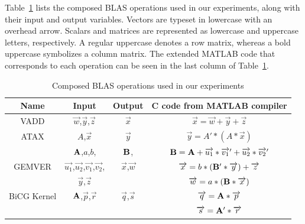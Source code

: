 \documentclass[runningheads]{llncs}
\begin{document}
Table~\ref{tbl:blas-ops} lists the composed BLAS operations used in
our experiments, along with their input and output variables. Vectors
are typeset in lowercase with an overhead arrow. Scalars and matrices
are represented as lowercase and uppercase letters, respectively. A
regular uppercase denotes a row matrix, whereas a bold uppercase
symbolizes a column matrix. The extended MATLAB code that corresponds
to each operation can be seen in the last column of
Table~\ref{tbl:blas-ops}.


\begin{table}[htb] 
\vspace{-.1in} 
\caption{Composed BLAS operations used in our experiments}
\label{tbl:blas-ops}
\small
\centering 
\vspace{-.1in} 
\begin{tabular}{|c|c|c|c|} 
\hline 
Name & Input & Output & C code from MATLAB compiler \\
\hline 
\hline 
VADD & $\overrightarrow{w}$,$\overrightarrow{y}$,$\overrightarrow{z}$ & $\overrightarrow{x}$ &
$\overrightarrow{x} = \overrightarrow{w} + \overrightarrow{y} + \overrightarrow{z}$ \\ 
\hline 
ATAX & $A$,$\overrightarrow{x}$ & $\overrightarrow{y}$ & 
$\overrightarrow{y} = A' * (A * \overrightarrow{x})$ \\ 
\hline 
 & ${\bf A}$,$a$,$b$, & ${\bf B}$, & ${\bf B} = {\bf A} + \overrightarrow{u_1} * \overrightarrow{v_1}' + \overrightarrow{u_2} * \overrightarrow{v_2}'$\\
GEMVER & $\overrightarrow{u_1}$,$\overrightarrow{u_2}$,$\overrightarrow{v_1}$,$\overrightarrow{v_2}$, & $\overrightarrow{x}$,$\overrightarrow{w}$ & $\overrightarrow{x} = b * ({\bf B}' * \overrightarrow{y}) + \overrightarrow{z}$\\
& $\overrightarrow{y}$,$\overrightarrow{z}$ & & $\overrightarrow{w} = a * ({\bf B} * \overrightarrow{x})$\\
\hline 
BiCG Kernel & ${\bf A}$,$\overrightarrow{p}$,$\overrightarrow{r}$ & $\overrightarrow{q}$,$\overrightarrow{s}$ & $\overrightarrow{q} = {\bf A} * \overrightarrow{p}$ \\
& & & $\overrightarrow{s} = {\bf A}' * \overrightarrow{r}$\\
\hline 
\end{tabular} 
\vspace{-.2in} 
\end{table} 
\end{document}
